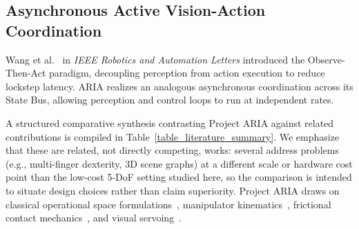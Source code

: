 \documentclass[journal]{IEEEtran}
\begin{document}
\subsection{Asynchronous Active Vision-Action Coordination}
Wang et al.~\cite{aria_096_group_2025_observe} in \textit{IEEE Robotics and Automation Letters} introduced the Observe-Then-Act paradigm, decoupling perception from action execution to reduce lockstep latency. ARIA realizes an analogous asynchronous coordination across its State Bus, allowing perception and control loops to run at independent rates.

A structured comparative synthesis contrasting Project ARIA against related contributions is compiled in Table~\ref{table_literature_summary}. We emphasize that these are related, not directly competing, works: several address problems (e.g., multi-finger dexterity, 3D scene graphs) at a different scale or hardware cost point than the low-cost 5-DoF setting studied here, so the comparison is intended to situate design choices rather than claim superiority. Project ARIA draws on classical operational space formulations~\cite{khatib1987unified}, manipulator kinematics~\cite{craig2005introduction,lynch2017modern}, frictional contact mechanics~\cite{mason2001mechanics}, and visual servoing~\cite{chaumette2006visual}.
\end{document}

